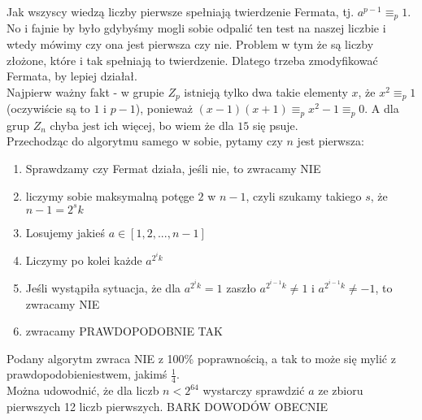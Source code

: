 Jak wszyscy wiedzą liczby pierwsze spełniają twierdzenie Fermata, tj. $a^{p-1}\equiv_p 1$. No i fajnie by było gdybyśmy mogli sobie odpalić ten test na naszej liczbie i wtedy mówimy czy ona jest pierwsza czy nie. Problem w tym że są liczby złożone, które i tak spełniają to twierdzenie. Dlatego trzeba zmodyfikować Fermata, by lepiej działał.\\
Najpierw ważny fakt - w grupie $Z_p$ istnieją tylko dwa takie elementy $x$, że $x^2\equiv_p 1$ (oczywiście są to $1$ i $p-1$), ponieważ $(x-1)(x+1)\equiv_px^2-1\equiv_p0$. A dla grup $Z_n$ chyba jest ich więcej, bo wiem że dla $15$ się psuje.\\
Przechodząc do algorytmu samego w sobie, pytamy czy $n$ jest pierwsza:\\
\begin{enumerate}
\item Sprawdzamy czy Fermat działa, jeśli nie, to zwracamy NIE
\item liczymy sobie maksymalną potęge $2$ w $n-1$, czyli szukamy takiego $s$, że $n-1=2^sk$
\item Losujemy jakieś $a \in [1,2,...,n-1]$
\item Liczymy po kolei każde $a^{2^ik}$
\item Jeśli wystąpiła sytuacja, że dla $a^{2^ik}=1$ zaszło $a^{2^{i-1}k}\neq1$ i $a^{2^{i-1}k}\neq-1$, to zwracamy NIE
\item zwracamy PRAWDOPODOBNIE TAK
\end{enumerate}
Podany algorytm zwraca NIE z 100\% poprawnością, a tak to może się mylić z prawdopodobieniestwem, jakimś $\frac{1}{4}$.\\
Można udowodnić, że dla liczb $n<2^{64}$ wystarczy sprawdzić $a$ ze zbioru pierwszych 12 liczb pierwszych. BARK DOWODÓW OBECNIE